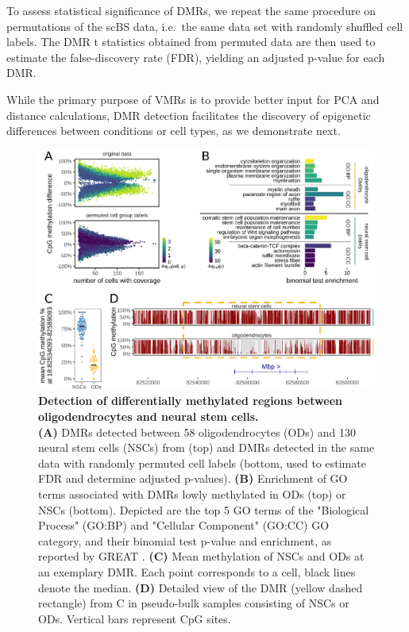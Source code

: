 \documentclass[twocolumn,10pt]{article}
\begin{document}
To assess statistical significance of DMRs, we repeat the same procedure on permutations of the scBS data, i.e.\ the same data set with randomly shuffled cell labels.
The DMR t statistics obtained from permuted data are then used to estimate the false-discovery rate (FDR), yielding an adjusted p-value for each DMR.

While the primary purpose of VMRs is to provide better input for PCA and distance calculations, DMR detection facilitates the discovery of epigenetic differences between conditions or cell types, as we demonstrate next.

\begin{figure}
	\begin{center}
		\includegraphics[width=.7\textwidth]{figures/Fig_DMRs.png}
	\end{center}
	\caption{\small \textbf{Detection of differentially methylated regions between oligodendrocytes and neural stem cells.}\\
		\textbf{(A)} DMRs detected between 58 oligodendrocytes (ODs) and 130 neural stem cells (NSCs) from \citet{kremer_scnmt} (top) and DMRs detected in the same data with randomly permuted cell labels (bottom, used to estimate FDR and determine adjusted p-values).
		\textbf{(B)} Enrichment of GO terms associated with DMRs lowly methylated in ODs (top) or NSCs (bottom).
		Depicted are the top 5 GO terms of the "Biological Process" (GO:BP) and "Cellular Component" (GO:CC) GO category, and their binomial test p-value and enrichment, as reported by GREAT \citep{mclean2010great}.
		\textbf{(C)} Mean methylation of NSCs and ODs at an exemplary DMR.
		Each point corresponds to a cell, black lines denote the median.
		\textbf{(D)} Detailed view of the DMR (yellow dashed rectangle) from C in pseudo-bulk samples consisting of NSCs or ODs.
		Vertical bars represent CpG sites.
	}
	\label{fig:dmr}
\end{figure}
\end{document}

